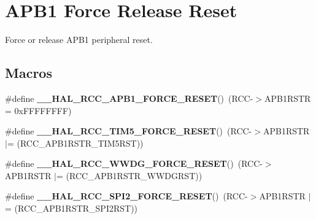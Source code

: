 \hypertarget{group___r_c_c___a_p_b1___force___release___reset}{}\section{A\+P\+B1 Force Release Reset}
\label{group___r_c_c___a_p_b1___force___release___reset}


Force or release A\+P\+B1 peripheral reset.  


\subsection*{Macros}
\begin{DoxyCompactItemize}
\item 
\#define {\bfseries \+\_\+\+\_\+\+H\+A\+L\+\_\+\+R\+C\+C\+\_\+\+A\+P\+B1\+\_\+\+F\+O\+R\+C\+E\+\_\+\+R\+E\+S\+ET}()~(R\+CC-\/$>$A\+P\+B1\+R\+S\+TR = 0x\+F\+F\+F\+F\+F\+F\+F\+F)\hypertarget{group___r_c_c___a_p_b1___force___release___reset_ga6f6e7048eca1abd1be132027f5b79465}{}\label{group___r_c_c___a_p_b1___force___release___reset_ga6f6e7048eca1abd1be132027f5b79465}

\item 
\#define {\bfseries \+\_\+\+\_\+\+H\+A\+L\+\_\+\+R\+C\+C\+\_\+\+T\+I\+M5\+\_\+\+F\+O\+R\+C\+E\+\_\+\+R\+E\+S\+ET}()~(R\+CC-\/$>$A\+P\+B1\+R\+S\+TR $\vert$= (R\+C\+C\+\_\+\+A\+P\+B1\+R\+S\+T\+R\+\_\+\+T\+I\+M5\+R\+ST))\hypertarget{group___r_c_c___a_p_b1___force___release___reset_ga20ca12317dd14485d79902863aad063b}{}\label{group___r_c_c___a_p_b1___force___release___reset_ga20ca12317dd14485d79902863aad063b}

\item 
\#define {\bfseries \+\_\+\+\_\+\+H\+A\+L\+\_\+\+R\+C\+C\+\_\+\+W\+W\+D\+G\+\_\+\+F\+O\+R\+C\+E\+\_\+\+R\+E\+S\+ET}()~(R\+CC-\/$>$A\+P\+B1\+R\+S\+TR $\vert$= (R\+C\+C\+\_\+\+A\+P\+B1\+R\+S\+T\+R\+\_\+\+W\+W\+D\+G\+R\+ST))\hypertarget{group___r_c_c___a_p_b1___force___release___reset_gaf60e74dcb0fdadafd6b4762aa81fc409}{}\label{group___r_c_c___a_p_b1___force___release___reset_gaf60e74dcb0fdadafd6b4762aa81fc409}

\item 
\#define {\bfseries \+\_\+\+\_\+\+H\+A\+L\+\_\+\+R\+C\+C\+\_\+\+S\+P\+I2\+\_\+\+F\+O\+R\+C\+E\+\_\+\+R\+E\+S\+ET}()~(R\+CC-\/$>$A\+P\+B1\+R\+S\+TR $\vert$= (R\+C\+C\+\_\+\+A\+P\+B1\+R\+S\+T\+R\+\_\+\+S\+P\+I2\+R\+ST))\hypertarget{group___r_c_c___a_p_b1___force___release___reset_ga869e4f5c1132e3dfce084099cf454c51}{}\label{group___r_c_c___a_p_b1___force___release___reset_ga869e4f5c1132e3dfce084099cf454c51}


\end{DoxyCompactItemize}
